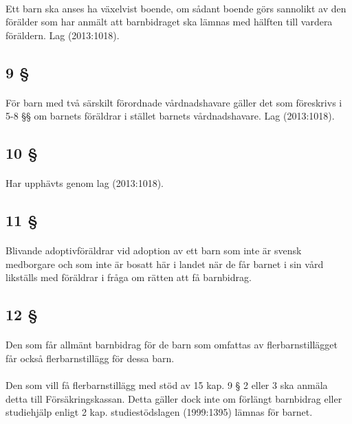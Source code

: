 \documentclass[a4paper,notitlepage,openany,10pt]{book}
\begin{document}
\paragraph*{}
Ett barn ska anses ha växelvist boende, om sådant boende görs sannolikt av den förälder som har anmält att barnbidraget ska lämnas med hälften till vardera föräldern.
Lag (2013:1018).
\subsection*{9 §}
\paragraph*{}
För barn med två särskilt förordnade vårdnadshavare gäller det som föreskrivs i 5-8 §§ om barnets föräldrar i stället barnets vårdnadshavare.
Lag (2013:1018).
\subsection*{10 §}
\paragraph*{}
Har upphävts genom
lag (2013:1018).
\subsection*{11 §}
\paragraph*{}
Blivande adoptivföräldrar vid adoption av ett barn som inte är svensk medborgare och som inte är bosatt här i landet när de får barnet i sin vård likställs med föräldrar i fråga om rätten att få barnbidrag.
\subsection*{12 §}
\paragraph*{}
Den som får allmänt barnbidrag för de barn som omfattas av flerbarnstillägget får också flerbarnstillägg för dessa barn.
\paragraph*{}
Den som vill få flerbarnstillägg med stöd av 15 kap. 9 § 2 eller 3 ska anmäla detta till Försäkringskassan. Detta gäller dock inte om förlängt barnbidrag eller studiehjälp enligt 2 kap. studiestödslagen (1999:1395) lämnas för barnet.
\end{document}
